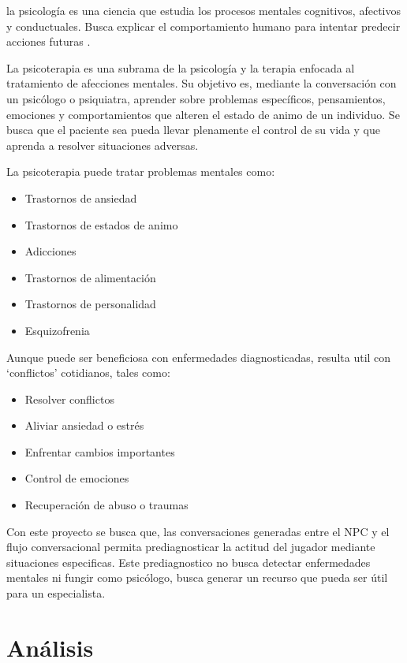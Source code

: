 \documentclass[12pt,twoside]{article}
\begin{document}
	la psicología es una ciencia que estudia los procesos mentales cognitivos, afectivos y conductuales. Busca explicar el comportamiento humano para intentar predecir acciones futuras \cite{info: terapia2}.
	
	La psicoterapia es una subrama de la psicología y la terapia enfocada al tratamiento de afecciones mentales. Su objetivo es, mediante la conversación con un psicólogo o psiquiatra, aprender sobre problemas específicos, pensamientos, emociones y comportamientos que alteren el estado de animo de un individuo. Se busca que el paciente sea pueda llevar plenamente el control de su vida y que aprenda a resolver situaciones adversas.
	
	La psicoterapia puede tratar problemas mentales como:
	\begin{itemize}[noitemsep]
		\item Trastornos de ansiedad
		\item Trastornos de estados de animo
		\item Adicciones
		\item Trastornos de alimentación
		\item Trastornos de personalidad
		\item Esquizofrenia
	\end{itemize}
	
	Aunque puede ser beneficiosa con enfermedades diagnosticadas, resulta util con `conflictos' cotidianos, tales como:
	\begin{itemize}[noitemsep]
		\item Resolver conflictos
		\item Aliviar ansiedad o estrés
		\item Enfrentar cambios importantes
		\item Control de emociones
		\item Recuperación de abuso o traumas \cite{info: terapia3}
	\end{itemize}
	
	Con este proyecto se busca que, las conversaciones generadas entre el NPC y el flujo conversacional permita prediagnosticar la actitud del jugador mediante situaciones especificas. Este prediagnostico no busca detectar enfermedades mentales ni fungir como psicólogo, busca generar un recurso que pueda ser útil para un especialista.
	
	\clearpage
	\section{Análisis}
	
\end{document}
